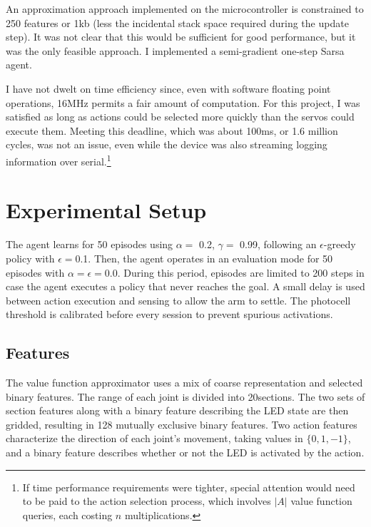 \documentclass{article}
\begin{document}
	An approximation approach implemented on the microcontroller is constrained to 250 features or 1kb (less the incidental stack space required during the update step). It was not clear that this would be sufficient for good performance, but it was the only feasible approach. I implemented a semi-gradient one-step Sarsa agent.
		
	I have not dwelt on time efficiency since, even with software floating point operations, 16MHz permits a fair amount of computation. For this project, I was satisfied as long as actions could be selected more quickly than the servos could execute them. Meeting this deadline, which was about 100ms, or 1.6 million cycles, was not an issue, even while the device was also streaming logging information over serial.\footnote{If time performance requirements were tighter, special attention would need to be paid to the action selection process, which involves $|A|$ value function queries, each costing $n$ multiplications.}

	
	
	\section{Experimental Setup}
	

	The agent learns for 50 episodes using $\alpha =$ 0.2, $\gamma =$ 0.99,  following an $\epsilon$-greedy policy with $\epsilon=$0.1. Then, the agent operates in an evaluation mode for 50 episodes with $\alpha=\epsilon=0.0$. During this period, episodes are limited to 200 steps in case the agent executes a policy that never reaches the goal. A small delay is used between action execution and sensing to allow the arm to settle. The photocell threshold is calibrated before every session to prevent spurious activations.
	
	\subsection{Features}

	The value function approximator uses a mix of coarse representation and selected binary features. The range of each joint is divided into 20\degree\space sections. The two sets of section features along with a binary feature describing the LED state are then gridded, resulting in 128 mutually exclusive binary features. Two action features characterize the direction of each joint's movement, taking values in $\{0, 1, -1\}$, and a binary feature describes whether or not the LED is activated by the action.
	
\end{document}
